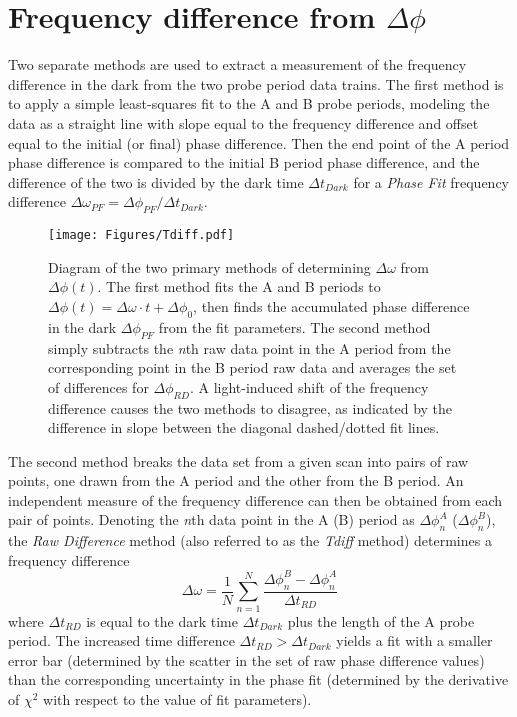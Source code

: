 \documentclass [10pt, twoside] {uwthesis}[2012/04/02]
\begin{document}
\section{Frequency difference from $\Delta\phi$}
Two separate methods are used to extract a measurement of the frequency difference in the dark from the two probe period data trains. The first method is to apply a simple least-squares fit to the A and B probe periods, modeling the data as a straight line with slope equal to the frequency difference and offset equal to the initial (or final) phase difference. Then the end point of the A period phase difference is compared to the initial B period phase difference, and the difference of the two is divided by the dark time $\Delta t_{Dark}$ for a \textit{Phase Fit} frequency difference $\Delta\omega_{PF} = \Delta\phi_{PF}/\Delta t_{Dark}$. 
\begin{figure}
\begin{center}
\texttt{[image: Figures/Tdiff.pdf]}
\end{center}
\caption[Comparative illustration of frequency difference methods]
{\narrower Diagram of the two primary methods of determining $\Delta\omega$ from $\Delta\phi (t)$. The first method fits the A and B periods to $\Delta\phi(t) = \Delta\omega \cdot t + \Delta\phi_0$, then finds the accumulated phase difference in the dark $\Delta\phi_{PF}$ from the fit parameters. The second method simply subtracts the \textit{n}th raw data point in the A period from the corresponding point in the B period raw data and averages the set of differences for $\Delta\phi_{RD}$. A light-induced shift of the frequency difference causes the two methods to disagree, as indicated by the difference in slope between the diagonal dashed/dotted fit lines.}
\label{TDiffVsPhaseFit}
\end{figure}
The second method breaks the data set from a given scan into pairs of raw points, one drawn from the A period and the other from the B period. An independent measure of the frequency difference can then be obtained from each pair of points. Denoting the \textit{n}th data point in the A (B) period as $\Delta\phi^A_n$ ($\Delta\phi^B_n$), the \textit{Raw Difference} method (also referred to as the \textit{Tdiff} method) determines a frequency difference 
\begin{equation}
\Delta\omega = \dfrac{1}{N} \sum^N_{n=1} \dfrac{\Delta\phi^B_n - \Delta\phi^A_n}{\Delta t_{RD}}
\end{equation}
where $\Delta t_{RD}$ is equal to the dark time $\Delta t_{Dark}$ plus the length of the A probe period. The increased time difference $\Delta t_{RD} > \Delta t_{Dark}$ yields a fit with a smaller error bar (determined by the scatter in the set of raw phase difference values) than the corresponding uncertainty in the phase fit (determined by the derivative of $\chi^2$ with respect to the value of fit parameters).
\end{document}
